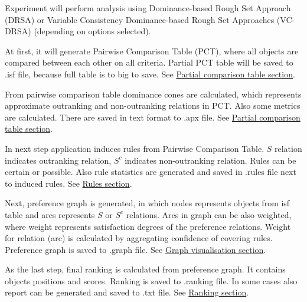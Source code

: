 Experiment will perform analysis using Dominance-based Rough Set Approach (DRSA) or Variable Consistency Dominance-based Rough Set Approaches (VC-DRSA) (depending on options selected).
 
 At first, it will generate Pairwise Comparison Table (PCT), where all objects are compared between each other on all criteria. Partial PCT table will be saved to .isf file, because full table is to big to save.
 See \hyperref[sub:pct-isf]{Partial comparison table section}.
 
 From pairwise comparison table dominance cones are calculated, which represents approximate outranking and non-outranking relations in PCT. Also some metrics are calculated. There are saved in text format to .apx file. 
 See \hyperref[sub:pct-apx]{Partial comparison table section}.
 
 In next step application induces rules from Pairwise Comparison Table. $S$ relation indicates outranking relation, $S^{c}$ indicates non-outranking relation. Rules can be certain or possible. Also rule statistics are generated and saved in .rules file next to induced rules. 
 See \hyperref[section:rules]{Rules section}.
 
 Next, preference graph is generated, in which nodes represents objects from isf table and arcs represents $S$ or $S^{c}$ relations. Arcs in graph can be also weighted, where weight represents satisfaction degrees of the preference relations. Weight for relation (arc) is calculated by aggregating confidence of covering rules. Preference graph is saved to .graph file.
 See \hyperref[section:graph]{Graph visualisation section}.
 
 As the last step, final ranking is calculated from preference graph. It contains objects positions and scores. Ranking is saved to .ranking file. In some cases also report can be generated and saved to .txt file.
  See \hyperref[section:ranking]{Ranking section}.
 
 
\vfill\newpage